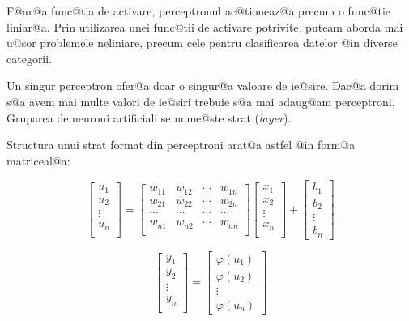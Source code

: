 \begin{observatia}
	F@ar@a func@tia de activare, perceptronul ac@tioneaz@a precum o func@tie liniar@a. Prin utilizarea unei func@tii de activare potrivite, puteam aborda mai u@sor problemele neliniare, precum cele pentru clasificarea datelor @in diverse categorii.
\end{observatia}

Un singur perceptron ofer@a doar o singur@a valoare de ie@sire. Dac@a dorim s@a avem mai multe valori de ie@siri trebuie s@a mai adaug@am perceptroni. Gruparea de neuroni artificiali se nume@ste strat ({\sl layer}).

Structura unui strat format din perceptroni arat@a astfel @in form@a matriceal@a:

$$
	\begin{bmatrix}
		u_1 \\
		u_2 \\
		\vdots \\ 
		u_n \\
	\end{bmatrix}	
	= 
	\begin{bmatrix}
		w_{11} & w_{12} & \cdots & w_{1n} \\
		w_{21} & w_{22} & \cdots & w_{2n} \\
		\cdots & \cdots & \cdots & \cdots \\
		w_{n1} & w_{n2} & \cdots & w_{nn} \\
	\end{bmatrix}
	\begin{bmatrix}
		x_1 \\
		x_2 \\
		\vdots \\
		x_n \\
	\end{bmatrix}
	+
	\begin{bmatrix}
		b_1 \\
		b_2 \\
		\vdots \\
		b_n
	\end{bmatrix}
$$

$$
\begin{bmatrix}
		y_1 \\
		y_2 \\
		\vdots \\ 
		y_n \\
	\end{bmatrix}	
	=
	\begin{bmatrix}
		\varphi (u_1)\\
		\varphi	(u_2) \\
		\vdots \\
		\varphi (u_n)
	\end{bmatrix}
$$

